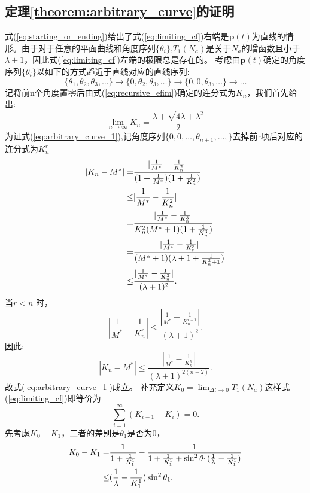 \subsection{定理\ref{theorem:arbitrary_curve}的证明}\label{B_F_6}
式(\ref{eq:starting_or_ending})给出了式(\ref{eq:limiting_cf})右端是$\bm{p}(t)$为直线的情形。由于对于任意的平面曲线和角度序列$\{\theta_i\}$,$T_1(N_a)$是关于$N_a$的增函数且小于$\lambda+1$，因此式(\ref{eq:limiting_cf})左端的极限总是存在的。
考虑由$\bm{p}(t)$确定的角度序列$\{\theta_i\}$以如下的方式趋近于直线对应的直线序列:
\begin{equation}
\{\theta_1,\theta_2,\theta_3,\dots\}\rightarrow\{0,\theta_2,\theta_3,\dots\}\rightarrow
\{0,0,\theta_3,\dots\}\rightarrow\dots
\end{equation}
记将前n个角度置零后由式(\ref{eq:recursive_efim})确定的连分式为$K_n$，我们首先给出:
\begin{equation}\label{eq:arbitrary_curve_1}
\lim_{n\to\infty}K_n=\frac{\lambda+\sqrt{4\lambda+\lambda^2}}{2}
\end{equation}
为证式(\ref{eq:arbitrary_curve_1}),记角度序列$\{0,0,\dots,\theta_{n+1},\dots,\}$去掉前r项后对应的连分式为$K^r_n$
\begin{align}\notag
|K_n-M^*|=&\frac{|\frac{1}{M^*}-\frac{1}{K^2_n}|}{(1+\frac{1}{M^*})(1+\frac{1}{K^2_n})}\\
\leq &|\frac{1}{M^*}-\frac{1}{K^2_n}|\notag\\
= &\frac{|\frac{1}{M^*}-\frac{1}{K^3_n}|}{K^2_n(M^*+1)(1+\frac{1}{K^3_n})}\\
=& \frac{|\frac{1}{M^*}-\frac{1}{K^3_n}|}{(M^*+1)(\lambda+1+\frac{1}{K^3_n+1})}\notag\\
\leq & \frac{|\frac{1}{M^*}-\frac{1}{K^3_n}|}{(\lambda+1)^2}.\notag
\end{align}
当$r<n$ 时，
\begin{equation}
|\frac{1}{M^*}-\frac{1}{K^r_n}|\leq \frac{|\frac{1}{M^*}-\frac{1}{K^{r+1}_n}|}{(\lambda+1)^2}.
\end{equation}
因此:
\begin{equation}
|K_n-M^*|\leq \frac{|\frac{1}{M^*}-\frac{1}{K^{n}_n}|}{(\lambda+1)^{2(n-2)}}.
\end{equation}
故式(\ref{eq:arbitrary_curve_1})成立。
补充定义$K_0=\lim_{\Delta t\to 0}T_1(N_a)$这样式(\ref{eq:limiting_cf})即等价为
\begin{equation}\label{eq:equivalent_limiting_cf}
\sum_{i=1}^{\infty}(K_{i-1}-K_{i})=0.
\end{equation}
先考虑$K_0-K_1$，二者的差别是$\theta_1$是否为0，
\begin{align}\notag
K_0-K_1=&\frac{1}{1+\frac{1}{K_1^1}}-\frac{1}{1+\frac{1}{K_1^1}+\sin^2\theta_1(\frac{1}{\lambda}-\frac{1}{K_1^1})}\\
\leq & (\frac{1}{\lambda}-\frac{1}{K_1^1})\sin^2\theta_1.
\end{align}
